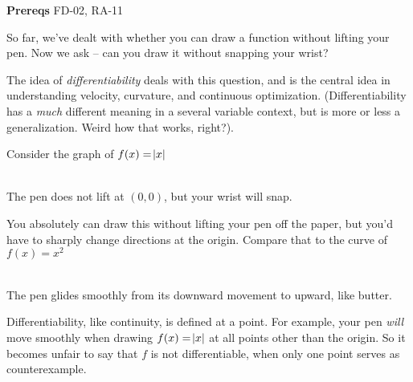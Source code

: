 

\textbf{Prereqs} FD-02, RA-11

So far, we've dealt with whether you can draw a function without lifting your pen. Now we ask -- can you draw it without snapping your wrist?

The idea of \emph{differentiability} deals with this question, and is the central idea in understanding velocity, curvature, and continuous optimization. (Differentiability has a \emph{much} different meaning in a several variable context, but is more or less a generalization. Weird how that works, right?).

Consider the graph of $f(x) = \abs{x}$
\begin{center}
\\
The pen does not lift at $(0, 0)$, but your wrist will snap.
\end{center}
You absolutely can draw this without lifting your pen off the paper, but you'd have to sharply change directions at the origin. Compare that to the curve of $f(x) = x^2$
\begin{center}
\\
The pen glides smoothly from its downward movement to upward, like butter.
\end{center}
\newpage
Differentiability, like continuity, is defined at a point. For example, your pen \emph{will} move smoothly when drawing $f(x) = \abs x$ at all points other than the origin. So it becomes unfair to say that $f$ is not differentiable, when only one point serves as counterexample.

